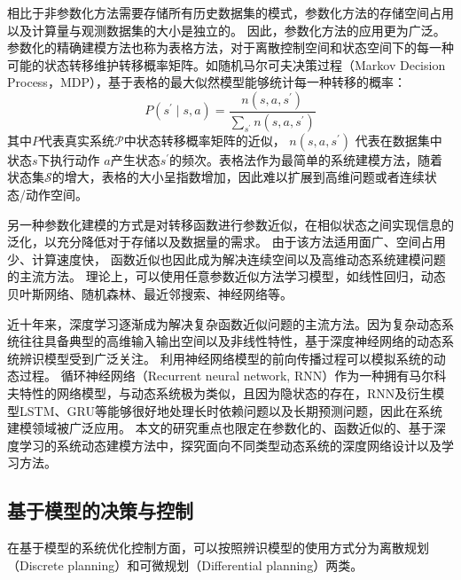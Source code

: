 相比于非参数化方法需要存储所有历史数据集的模式，参数化方法的存储空间占用以及计算量与观测数据集的大小是独立的。
因此，参数化方法的应用更为广泛。
参数化的精确建模方法也称为表格方法，对于离散控制空间和状态空间下的每一种可能的状态转移维护转移概率矩阵。如随机马尔可夫决策过程（Markov Decision Process，MDP），基于表格的最大似然模型能够统计每一种转移的概率：
\begin{equation}
    P\left(s^{\prime} \mid s, a\right)=\frac{n\left(s, a, s^{\prime}\right)}{\sum_{s^{\prime}} n\left(s, a, s^{\prime}\right)}
\end{equation}
其中$P$代表真实系统$\mathcal{\mathcal { P }}$中状态转移概率矩阵的近似，
$n\left(s, a, s^{\prime}\right)$ 代表在数据集中状态$s$下执行动作 $a$产生状态$s^{\prime}$的频次。表格法作为最简单的系统建模方法，随着状态集$\mathcal{S}$的增大，表格的大小呈指数增加，因此难以扩展到高维问题或者连续状态/动作空间。

另一种参数化建模的方式是对转移函数进行参数近似，在相似状态之间实现信息的泛化，以充分降低对于存储以及数据量的需求。
由于该方法适用面广、空间占用少、计算速度快，
函数近似也因此成为解决连续空间以及高维动态系统建模问题的主流方法。
理论上，可以使用任意参数近似方法学习模型，如线性回归\cite{silver2008sample}，动态贝叶斯网络、随机森林、最近邻搜索、神经网络\cite{werbos1989neural}等。

近十年来，深度学习逐渐成为解决复杂函数近似问题的主流方法。因为复杂动态系统往往具备典型的高维输入输出空间以及非线性特性，基于深度神经网络的动态系统辨识模型受到广泛关注。
利用神经网络模型的前向传播过程可以模拟系统的动态过程\cite{temeng1995model, tan1996nonlinear}。
循环神经网络（Recurrent neural network, RNN）作为一种拥有马尔科夫特性的网络模型，与动态系统极为类似，且因为隐状态的存在，RNN及衍生模型LSTM、GRU等能够很好地处理长时依赖问题以及长期预测问题，因此在系统建模领域被广泛应用\cite{delgado1995dynamic, zamarreno1998state}。
本文的研究重点也限定在参数化的、函数近似的、基于深度学习的系统动态建模方法中，探究面向不同类型动态系统的深度网络设计以及学习方法。

\subsection{基于模型的决策与控制}
在基于模型的系统优化控制方面，可以按照辨识模型的使用方式分为离散规划（Discrete planning）和可微规划（Differential planning）两类。

